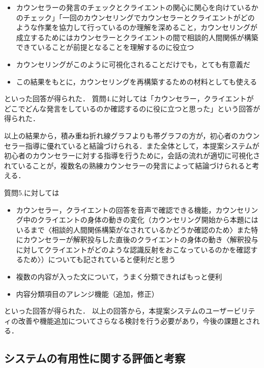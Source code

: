 \documentclass[shuuron]{kuee}
\begin{document}
\begin{itemize}

  \item カウンセラーの発言のチェックとクライエントの関心に関心を向けているかのチェック」「一回のカウンセリングでカウンセラーとクライエントがどのような作業を協力して行っているのか理解を深めること，カウンセリングが成立するためにはカウンセラーとクライエントの間で相談的人間関係が構築できていることが前提となることを理解するのに役立つ
  \item カウンセリングがこのように可視化されることだけでも，とても有意義だ
  \item この結果をもとに，カウンセリングを再構築するための材料としても使える
\end{itemize}
といった回答が得られた．
質問4.に対しては「カウンセラー，クライエントがどこでどんな発言をしているのか確認するのに役に立つと思った」という回答が得られた．

以上の結果から，積み重ね折れ線グラフよりも帯グラフの方が，初心者のカウンセラー指導に優れていると結論づけられる．また全体として，本提案システムが初心者のカウンセラーに対する指導を行うために，会話の流れが適切に可視化されていることが，複数名の熟練カウンセラーの発言によって結論づけられると考える．

質問5.に対しては

\begin{itemize}

  \item カウンセラー，クライエントの回答を音声で確認できる機能，カウンセリング中のクライエントの身体の動きの変化（カウンセリング開始から本題にはいるまで〈相談的人間関係構築がなされているかどうか確認のため〉また特にカウンセラーが解釈投与した直後のクライエントの身体の動き〈解釈投与に対してクライエントがどのような認識反射をおこなっているのかを確認するため〉）についても記されていると便利だと思う
  \item 複数の内容が入った文について，うまく分類できればもっと便利
  \item 内容分類項目のアレンジ機能（追加，修正）
\end{itemize}
といった回答が得られた．
以上の回答から，本提案システムのユーザービリティの改善や機能追加についてさらなる検討を行う必要があり，今後の課題とされる．



\subsection{システムの有用性に関する評価と考察}%
\end{document}
